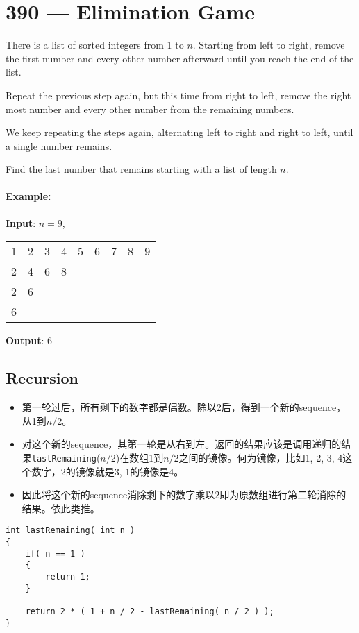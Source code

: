 \section{390 --- Elimination Game}
There is a list of sorted integers from 1 to $ n $. Starting from left to right, remove the first number and every other number afterward until you reach the end of the list.
\par
Repeat the previous step again, but this time from right to left, remove the right most number and every other number from the remaining numbers.
\par
We keep repeating the steps again, alternating left to right and right to left, until a single number remains.
\par
Find the last number that remains starting with a list of length $ n $.

\paragraph{Example:}

\begin{flushleft}
\textbf{Input}: $n = 9$,
\begin{table}[H]
\begin{tabular}{*{9}{l}}
1&  2&  3&  4&  5&  6&  7&  8&  9\\
2 & 4& 6& 8 & & & & & \\
2 & 6 &  &  &  &  &  &  & \\
6  &  &  &  &  &  &  &  & 
\end{tabular}
\end{table}
\textbf{Output}: 6
\end{flushleft}

\subsection{Recursion}
\begin{itemize}
\item 第一轮过后，所有剩下的数字都是偶数。除以2后，得到一个新的sequence，从1到$n/2$。
\item 对这个新的sequence，其第一轮是从右到左。返回的结果应该是调用递归的结果\texttt{lastRemaining}($n / 2$)在数组1到$n/2$之间的镜像。何为镜像，比如1, 2, 3, 4这个数字，2的镜像就是3, 1的镜像是4。
\item 因此将这个新的sequence消除剩下的数字乘以2即为原数组进行第二轮消除的结果。依此类推。
\end{itemize}

\setcounter{lstlisting}{0}
\begin{lstlisting}[style=customc, caption={Recursion}]
int lastRemaining( int n )
{
    if( n == 1 )
    {
        return 1;
    }

    return 2 * ( 1 + n / 2 - lastRemaining( n / 2 ) );
}
\end{lstlisting}

